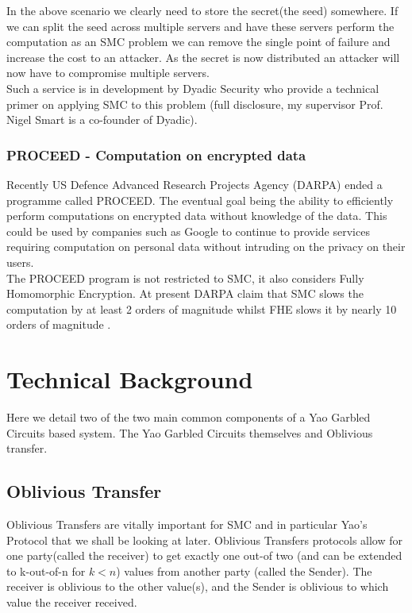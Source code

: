 \documentclass[ %
                    author={Nicholas Tutte},
                supervisor={Prof. Nigel Smart},
                    degree={MEng},
                     title={Secure Two Party Computation},
                  subtitle={A practical comparison of recent protocols},
                      type={Research - GG1K},
                      year={2015} ]{dissertation}
\begin{document}
				In the above scenario we clearly need to store the secret(the seed) somewhere. If we can split the seed across multiple servers and have these servers perform the computation as an SMC problem we can remove the single point of failure and increase the cost to an attacker. As the secret is now distributed an attacker will now have to compromise multiple servers.\\

				Such a service is in development by Dyadic Security who provide a technical primer on applying SMC to this problem \cite{DYADIC_MPC_Primer} (full disclosure, my supervisor Prof. Nigel Smart is a co-founder of Dyadic).

			\subsection{PROCEED - Computation on encrypted data} \label{sub2:PROCEED_DARPA}
				Recently US Defence Advanced Research Projects Agency (DARPA) ended a programme called PROCEED. The eventual goal being the ability to efficiently perform computations on encrypted data without knowledge of the data. This could be used by companies such as Google to continue to provide services requiring computation on personal data without intruding on the privacy on their users.\\

				The PROCEED program is not restricted to SMC, it also considers Fully Homomorphic Encryption. At present DARPA claim that SMC slows the computation by at least 2 orders of magnitude whilst FHE slows it by nearly 10 orders of magnitude \cite{DARPAPROceed}. 


	
	\chapter{Technical Background}
		Here we detail two of the two main common components of a Yao Garbled Circuits based system. The Yao Garbled Circuits themselves and Oblivious transfer.

		\section{Oblivious Transfer} \label{sec:OT_Intro}
			Oblivious Transfers are vitally important for SMC and in particular Yao's Protocol that we shall be looking at later. Oblivious Transfers protocols allow for one party(called the receiver) to get exactly one out-of two (and can be extended to k-out-of-n for $k < n$) values from another party (called the Sender). The receiver is oblivious to the other value(s), and the Sender is oblivious to which value the receiver received.\\
\end{document}
